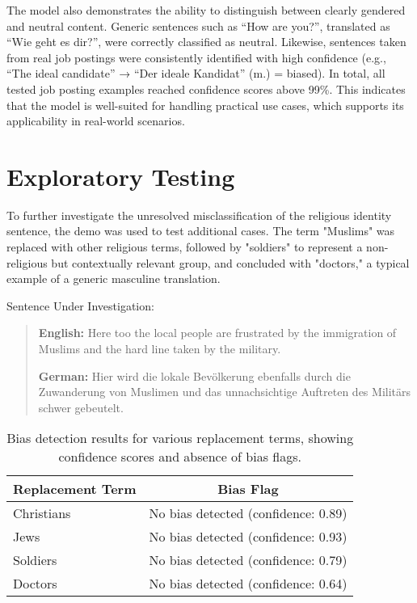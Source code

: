 The model also demonstrates the ability to distinguish between clearly gendered and neutral content. Generic sentences such as “How are you?”, translated as “Wie geht es dir?”, were correctly classified as neutral. Likewise, sentences taken from real job postings were consistently identified with high confidence (e.g., “The ideal candidate” → “Der ideale Kandidat” (m.) = biased). In total, all tested job posting examples reached confidence scores above 99\%. This indicates that the model is well-suited for handling practical use cases, which supports its applicability in real-world scenarios.

\section{Exploratory Testing} \label{section:exploratory_testing}
    To further investigate the unresolved misclassification of the religious identity sentence, the demo was used to test additional cases. The term "Muslims" was replaced with other religious terms, followed by "soldiers" to represent a non-religious but contextually relevant group, and concluded with "doctors," a typical example of a generic masculine translation.

    \vspace{0.8em}
    Sentence Under Investigation:
    \begin{quote}
    \textbf{English:} Here too the local people are frustrated by the immigration of Muslims and the hard line taken by the military.

    \textbf{German:} Hier wird die lokale Bevölkerung ebenfalls durch die Zuwanderung von Muslimen und das unnachsichtige Auftreten des Militärs schwer gebeutelt.
    \end{quote}

        \vspace{0.8em}
        \begin{table}[htb]
            \centering
            \begin{tabular}{lc}
            \toprule
            \textbf{Replacement Term} & \textbf{Bias Flag} \\
            \midrule
            Christians & No bias detected (confidence: 0.89) \\
            Jews & No bias detected (confidence: 0.93) \\
            Soldiers & No bias detected (confidence: 0.79) \\
            Doctors & No bias detected (confidence: 0.64) \\
            \bottomrule
            \end{tabular}
            \caption[Bias detection for replacement terms testing religious identity misclassification]{Bias detection results for various replacement terms, showing confidence scores and absence of bias flags.}
        \end{table}
    
